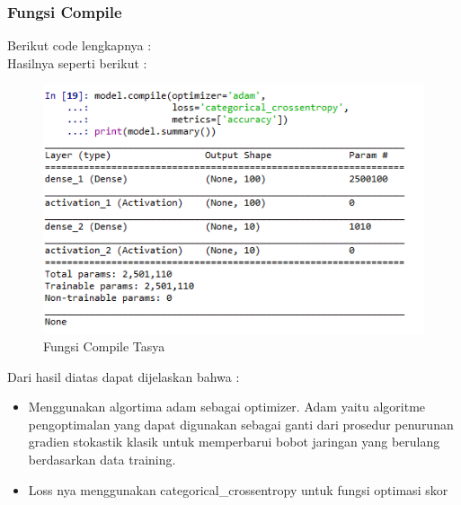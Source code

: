 \subsubsection{Fungsi Compile}
 Berikut code lengkapnya : \\

Hasilnya seperti berikut : \\
\begin{figure}[ht]
\centering
\includegraphics[scale=0.5]{figures/chapter6tasya18.png}
\caption{Fungsi Compile Tasya}
\label{Praktek}
\end{figure}
Dari hasil diatas dapat dijelaskan bahwa :\\
\begin{itemize}
\item Menggunakan algortima adam sebagai optimizer. Adam yaitu algoritme pengoptimalan yang dapat digunakan sebagai ganti dari prosedur penurunan gradien stokastik klasik untuk memperbarui bobot jaringan yang berulang berdasarkan data training.
\item Loss nya menggunakan categorical\_crossentropy untuk fungsi optimasi skor
\end{itemize}

